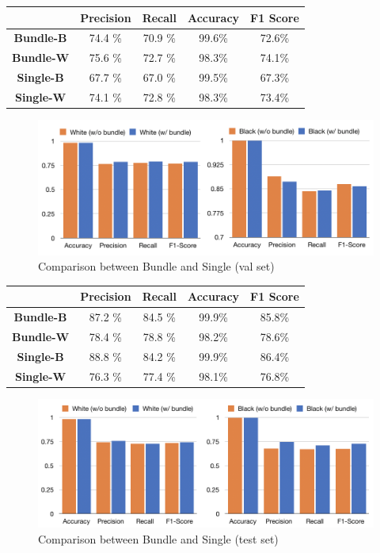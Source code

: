\documentclass[10pt,twocolumn,letterpaper]{article}
\begin{document}
\begin{minipage}{\linewidth}
   \centering
\begin{tabular}{ccccc}
   \toprule
   & Precision &Recall&Accuracy& F1 Score\\
   \midrule
   \textbf{Bundle-B} &74.4 \%& 70.9 \%&99.6\%& 72.6\%\\
   \textbf{Bundle-W} &75.6 \%& 72.7 \%&98.3\%& 74.1\%\\
   \textbf{Single-B} &67.7 \%& 67.0 \%&99.5\%& 67.3\%\\
   \textbf{Single-W} &74.1 \%& 72.8 \%&98.3\%& 73.4\%\\
   \bottomrule
   \end{tabular}
    \label{tab:prevdataset}

\end{minipage}

\begin{figure}[h!]
   \centering
   \includegraphics[width=\linewidth]{fig/18.png}
   \caption{Comparison between Bundle and Single (val set)}
\end{figure}

\begin{minipage}{\linewidth}
   \centering
\begin{tabular}{ccccc}
   \toprule
   & Precision &Recall&Accuracy& F1 Score\\
   \midrule
   \textbf{Bundle-B} &87.2 \%& 84.5 \%&99.9\%& 85.8\%\\
   \textbf{Bundle-W} &78.4 \%& 78.8 \%&98.2\%& 78.6\%\\
   \textbf{Single-B} &88.8 \%& 84.2 \%&99.9\%& 86.4\%\\
   \textbf{Single-W} &76.3 \%& 77.4 \%&98.1\%& 76.8\%\\
   \bottomrule
   \end{tabular}
    \label{tab:prevdataset}

\end{minipage}
\begin{figure}[h!]
   \centering
   \includegraphics[width=\linewidth]{fig/17.png}
   \caption{Comparison between Bundle and Single (test set)}
\end{figure}
\end{document}
